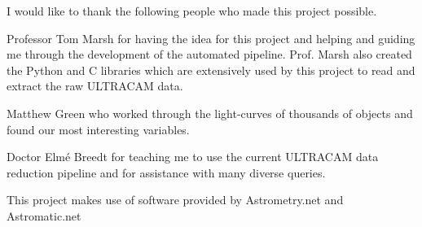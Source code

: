 \documentclass[11pt,a4paper]{report}      %
\begin{document}
\thesiscopyrightpage                 %

 \thesistitlepage                     %


\tableofcontents                     %

\begin{thesisacknowledgments}        %

I would like to thank the following people who made this project possible.

Professor Tom Marsh for having the idea for this project and helping and guiding me through the development of the automated pipeline. Prof. Marsh also created the Python and C libraries which are extensively used by this project to read and extract the raw ULTRACAM data. 

Matthew Green who worked through the light-curves of thousands of objects and found our most interesting variables. 

Doctor Elm\'e Breedt for teaching me to use the current ULTRACAM data reduction pipeline and for assistance with many diverse queries.

This project makes use of software provided by Astrometry.net and Astromatic.net

\end{thesisacknowledgments}
\end{document}
